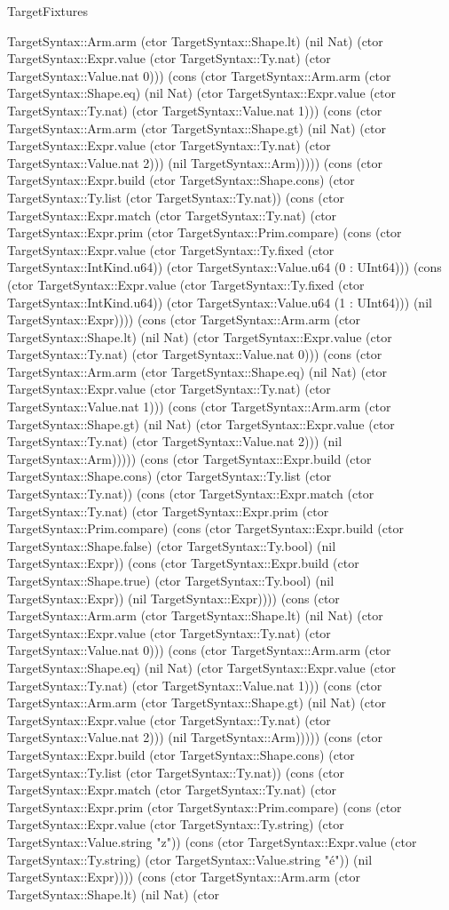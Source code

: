 \begin{lexlean}{TargetFixtures}
\begin{semanticmodule}
{TargetSyntax::Arm.arm (ctor TargetSyntax::Shape.lt) (nil Nat) (ctor TargetSyntax::Expr.value (ctor TargetSyntax::Ty.nat) (ctor TargetSyntax::Value.nat 0))) (cons (ctor TargetSyntax::Arm.arm (ctor TargetSyntax::Shape.eq) (nil Nat) (ctor TargetSyntax::Expr.value (ctor TargetSyntax::Ty.nat) (ctor TargetSyntax::Value.nat 1))) (cons (ctor TargetSyntax::Arm.arm (ctor TargetSyntax::Shape.gt) (nil Nat) (ctor TargetSyntax::Expr.value (ctor TargetSyntax::Ty.nat) (ctor TargetSyntax::Value.nat 2))) (nil TargetSyntax::Arm))))) (cons (ctor TargetSyntax::Expr.build (ctor TargetSyntax::Shape.cons) (ctor TargetSyntax::Ty.list (ctor TargetSyntax::Ty.nat)) (cons (ctor TargetSyntax::Expr.match (ctor TargetSyntax::Ty.nat) (ctor TargetSyntax::Expr.prim (ctor TargetSyntax::Prim.compare) (cons (ctor TargetSyntax::Expr.value (ctor TargetSyntax::Ty.fixed (ctor TargetSyntax::IntKind.u64)) (ctor TargetSyntax::Value.u64 (0 : UInt64))) (cons (ctor TargetSyntax::Expr.value (ctor TargetSyntax::Ty.fixed (ctor TargetSyntax::IntKind.u64)) (ctor TargetSyntax::Value.u64 (1 : UInt64))) (nil TargetSyntax::Expr)))) (cons (ctor TargetSyntax::Arm.arm (ctor TargetSyntax::Shape.lt) (nil Nat) (ctor TargetSyntax::Expr.value (ctor TargetSyntax::Ty.nat) (ctor TargetSyntax::Value.nat 0))) (cons (ctor TargetSyntax::Arm.arm (ctor TargetSyntax::Shape.eq) (nil Nat) (ctor TargetSyntax::Expr.value (ctor TargetSyntax::Ty.nat) (ctor TargetSyntax::Value.nat 1))) (cons (ctor TargetSyntax::Arm.arm (ctor TargetSyntax::Shape.gt) (nil Nat) (ctor TargetSyntax::Expr.value (ctor TargetSyntax::Ty.nat) (ctor TargetSyntax::Value.nat 2))) (nil TargetSyntax::Arm))))) (cons (ctor TargetSyntax::Expr.build (ctor TargetSyntax::Shape.cons) (ctor TargetSyntax::Ty.list (ctor TargetSyntax::Ty.nat)) (cons (ctor TargetSyntax::Expr.match (ctor TargetSyntax::Ty.nat) (ctor TargetSyntax::Expr.prim (ctor TargetSyntax::Prim.compare) (cons (ctor TargetSyntax::Expr.build (ctor TargetSyntax::Shape.false) (ctor TargetSyntax::Ty.bool) (nil TargetSyntax::Expr)) (cons (ctor TargetSyntax::Expr.build (ctor TargetSyntax::Shape.true) (ctor TargetSyntax::Ty.bool) (nil TargetSyntax::Expr)) (nil TargetSyntax::Expr)))) (cons (ctor TargetSyntax::Arm.arm (ctor TargetSyntax::Shape.lt) (nil Nat) (ctor TargetSyntax::Expr.value (ctor TargetSyntax::Ty.nat) (ctor TargetSyntax::Value.nat 0))) (cons (ctor TargetSyntax::Arm.arm (ctor TargetSyntax::Shape.eq) (nil Nat) (ctor TargetSyntax::Expr.value (ctor TargetSyntax::Ty.nat) (ctor TargetSyntax::Value.nat 1))) (cons (ctor TargetSyntax::Arm.arm (ctor TargetSyntax::Shape.gt) (nil Nat) (ctor TargetSyntax::Expr.value (ctor TargetSyntax::Ty.nat) (ctor TargetSyntax::Value.nat 2))) (nil TargetSyntax::Arm))))) (cons (ctor TargetSyntax::Expr.build (ctor TargetSyntax::Shape.cons) (ctor TargetSyntax::Ty.list (ctor TargetSyntax::Ty.nat)) (cons (ctor TargetSyntax::Expr.match (ctor TargetSyntax::Ty.nat) (ctor TargetSyntax::Expr.prim (ctor TargetSyntax::Prim.compare) (cons (ctor TargetSyntax::Expr.value (ctor TargetSyntax::Ty.string) (ctor TargetSyntax::Value.string "z")) (cons (ctor TargetSyntax::Expr.value (ctor TargetSyntax::Ty.string) (ctor TargetSyntax::Value.string "é")) (nil TargetSyntax::Expr)))) (cons (ctor TargetSyntax::Arm.arm (ctor TargetSyntax::Shape.lt) (nil Nat) (ctor }
\end{semanticmodule}
\end{lexlean}
